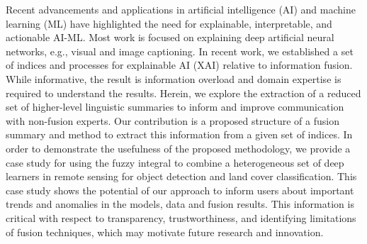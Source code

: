 

Recent advancements and applications in artificial intelligence (AI) and machine learning (ML) have highlighted the need for explainable, interpretable, and actionable AI-ML. Most work is focused on explaining deep artificial neural networks, e.g., visual and image captioning. In recent work, we established a set of indices and processes for explainable AI (XAI) relative to information fusion. While informative, the result is information overload and domain expertise is required to understand the results. Herein, we explore the extraction of a reduced set of higher-level linguistic summaries to inform and improve communication with non-fusion experts. Our contribution is a proposed structure of a fusion summary and method to extract this information from a given set of indices. In order to demonstrate the usefulness of the proposed methodology, we provide a case study for using the fuzzy integral to combine a heterogeneous set of deep learners in remote sensing for object detection and land cover classification.
This case study shows the potential of our approach to inform users about important trends and anomalies in the models, data and fusion results. This information is critical with respect to transparency, trustworthiness, and identifying limitations of fusion techniques, which may motivate future research and innovation.


